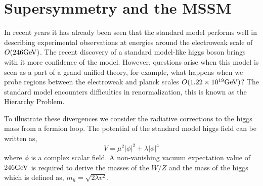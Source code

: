 \chapter{Supersymmetry and the MSSM}

In recent years it has already been seen that the standard model 
performs well in describing experimental observations at energies around
the electroweak scale of $O(246 \mathrm{GeV})$.
The recent discovery of a standard model-like higgs boson brings with it
more confidence of the model. However, questions arise when this model is seen as 
a part of a grand unified theory, for example, what happens when we probe
regions between the electroweak and planck scales $O(1.22 \times10^{19} \mathrm{GeV})$? 
The standard model encounters difficulties in renormalization, this is known
as the Hierarchy Problem\cite{Martin:1997ns}.

To illustrate these divergences we consider the radiative corrections to the higgs mass
from a fermion loop.
The potential of the standard model higgs field can be
written as, 
\begin{equation}
V= \mu^{2}|\phi|^{2}+\lambda|\phi|^{4}
\end{equation}
where $\phi$ is a complex scalar field.
A non-vanishing vacuum expectation value of $246 \mathrm{GeV}$ is required to derive the masses of the $W/Z$
and the mass of the higgs which is defined as, $m_{h}=\sqrt{2\lambda v^{2}}$.

